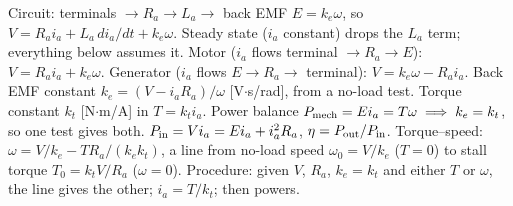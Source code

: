 \documentclass{article}
\begin{document}
Circuit: terminals $\to R_a \to L_a \to$ back EMF $E = k_e\omega$, so $V = R_a i_a + L_a\,di_a/dt + k_e\omega$.
Steady state ($i_a$ constant) drops the $L_a$ term; everything below assumes it.
Motor ($i_a$ flows terminal $\to R_a\to E$): $V = R_a i_a + k_e\omega$. 
Generator ($i_a$ flows $E\to R_a\to$ terminal): $V = k_e\omega - R_a i_a$.
Back EMF constant $k_e = (V - i_a R_a)/\omega$ [V$\cdot$s/rad], from a no-load test. Torque constant $k_t$ [N$\cdot$m/A] in $T = k_t i_a$.
Power balance $P_{\rm mech} = E i_a = T\omega \implies k_e = k_t$, so one test gives both.
$P_{\rm in} = Vi_a = Ei_a + i_a^2 R_a$, $\eta = P_{\rm out}/P_{\rm in}$.
Torque--speed: $\omega = V/k_e - TR_a/(k_e k_t)$, a line from no-load speed $\omega_0 = V/k_e$ ($T = 0$) to stall torque $T_0 = k_t V/R_a$ ($\omega = 0$).
Procedure: given $V$, $R_a$, $k_e = k_t$ and either $T$ or $\omega$, the line gives the other; $i_a = T/k_t$; then powers.
\end{document}
